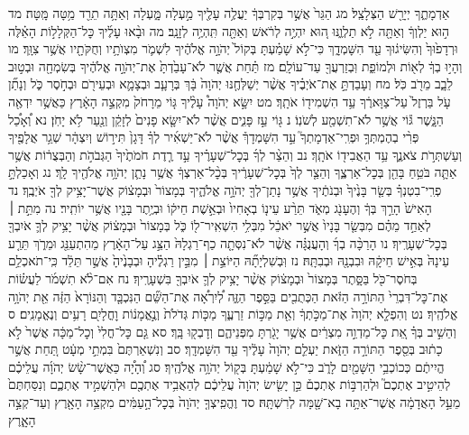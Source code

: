 \documentclass[twoside, openany, parskip=half, 11pt]{book}
\begin{document}
אַדְמָתֶ֑ךָ יְיָרֵ֖שׁ הַצְּלָצַֽל׃ מג הַגֵּר֙ אֲשֶׁ֣ר בְּקִרְבְּךָ֔ יַעֲלֶ֥ה עָלֶ֖יךָ מַ֣עְלָה מָּ֑עְלָה וְאַתָּ֥ה תֵרֵ֖ד מַ֥טָּה מָּֽטָּה׃ מד ה֣וּא יַלְוְךָ֔ וְאַתָּ֖ה לֹ֣א תַלְוֶ֑נּוּ ה֚וּא יִהְיֶ֣ה לְרֹ֔אשׁ וְאַתָּ֖ה תִּֽהְיֶ֥ה לְזָנָֽב׃ מה וּבָ֨אוּ עָלֶ֜יךָ כׇּל־הַקְּלָל֣וֹת הָאֵ֗לֶּה וּרְדָפ֙וּךָ֙ וְהִשִּׂיג֔וּךָ עַ֖ד הִשָּׁמְדָ֑ךְ כִּי־לֹ֣א שָׁמַ֗עְתָּ בְּקוֹל֙ יְהֹוָ֣ה אֱלֹהֶ֔יךָ לִשְׁמֹ֛ר מִצְוֺתָ֥יו וְחֻקֹּתָ֖יו אֲשֶׁ֥ר צִוָּֽךְ׃ מו וְהָי֣וּ בְךָ֔ לְא֖וֹת וּלְמוֹפֵ֑ת וּֽבְזַרְעֲךָ֖ עַד־עוֹלָֽם׃ מז תַּ֗חַת אֲשֶׁ֤ר לֹא־עָבַ֙דְתָּ֙ אֶת־יְהֹוָ֣ה אֱלֹהֶ֔יךָ בְּשִׂמְחָ֖ה וּבְט֣וּב לֵבָ֑ב מֵרֹ֖ב כֹּֽל׃ מח וְעָבַדְתָּ֣ אֶת־אֹיְבֶ֗יךָ אֲשֶׁ֨ר יְשַׁלְּחֶ֤נּוּ יְהֹוָה֙ בָּ֔ךְ בְּרָעָ֧ב וּבְצָמָ֛א וּבְעֵירֹ֖ם וּבְחֹ֣סֶר כֹּ֑ל וְנָתַ֞ן עֹ֤ל בַּרְזֶל֙ עַל־צַוָּארֶ֔ךָ עַ֥ד הִשְׁמִיד֖וֹ אֹתָֽךְ׃ מט יִשָּׂ֣א יְהֹוָה֩ עָלֶ֨יךָ גּ֤וֹי מֵרָחֹק֙ מִקְצֵ֣ה הָאָ֔רֶץ כַּאֲשֶׁ֥ר יִדְאֶ֖ה הַנָּ֑שֶׁר גּ֕וֹי אֲשֶׁ֥ר לֹא־תִשְׁמַ֖ע לְשֹׁנֽוֹ׃ נ גּ֖וֹי עַ֣ז פָּנִ֑ים אֲשֶׁ֨ר לֹא־יִשָּׂ֤א פָנִים֙ לְזָקֵ֔ן וְנַ֖עַר לֹ֥א יָחֹֽן׃ נא וְ֠אָכַ֠ל פְּרִ֨י בְהֶמְתְּךָ֥ וּפְרִֽי־אַדְמָתְךָ֮ עַ֣ד הִשָּׁמְדָךְ֒ אֲשֶׁ֨ר לֹא־יַשְׁאִ֜יר לְךָ֗ דָּגָן֙ תִּיר֣וֹשׁ וְיִצְהָ֔ר שְׁגַ֥ר אֲלָפֶ֖יךָ וְעַשְׁתְּרֹ֣ת צֹאנֶ֑ךָ עַ֥ד הַאֲבִיד֖וֹ אֹתָֽךְ׃ נב וְהֵצַ֨ר לְךָ֜ בְּכׇל־שְׁעָרֶ֗יךָ עַ֣ד רֶ֤דֶת חֹמֹתֶ֙יךָ֙ הַגְּבֹהֹ֣ת וְהַבְּצֻר֔וֹת אֲשֶׁ֥ר אַתָּ֛ה בֹּטֵ֥חַ בָּהֵ֖ן בְּכׇל־אַרְצֶ֑ךָ וְהֵצַ֤ר לְךָ֙ בְּכׇל־שְׁעָרֶ֔יךָ בְּכׇ֨ל־אַרְצְךָ֔ אֲשֶׁ֥ר נָתַ֛ן יְהֹוָ֥ה אֱלֹהֶ֖יךָ לָֽךְ׃ נג וְאָכַלְתָּ֣ פְרִֽי־בִטְנְךָ֗ בְּשַׂ֤ר בָּנֶ֙יךָ֙ וּבְנֹתֶ֔יךָ אֲשֶׁ֥ר נָתַן־לְךָ֖ יְהֹוָ֣ה אֱלֹהֶ֑יךָ בְּמָצוֹר֙ וּבְמָצ֔וֹק אֲשֶׁר־יָצִ֥יק לְךָ֖ אֹיְבֶֽךָ׃ נד הָאִישׁ֙ הָרַ֣ךְ בְּךָ֔ וְהֶעָנֹ֖ג מְאֹ֑ד תֵּרַ֨ע עֵינ֤וֹ בְאָחִיו֙ וּבְאֵ֣שֶׁת חֵיק֔וֹ וּבְיֶ֥תֶר בָּנָ֖יו אֲשֶׁ֥ר יוֹתִֽיר׃ נה מִתֵּ֣ת ׀ לְאַחַ֣ד מֵהֶ֗ם מִבְּשַׂ֤ר בָּנָיו֙ אֲשֶׁ֣ר יֹאכֵ֔ל מִבְּלִ֥י הִשְׁאִֽיר־ל֖וֹ כֹּ֑ל בְּמָצוֹר֙ וּבְמָצ֔וֹק אֲשֶׁ֨ר יָצִ֥יק לְךָ֛ אֹיִבְךָ֖ בְּכׇל־שְׁעָרֶֽיךָ׃ נו הָרַכָּ֨ה בְךָ֜ וְהָעֲנֻגָּ֗ה אֲשֶׁ֨ר לֹא־נִסְּתָ֤ה כַף־רַגְלָהּ֙ הַצֵּ֣ג עַל־הָאָ֔רֶץ מֵהִתְעַנֵּ֖ג וּמֵרֹ֑ךְ תֵּרַ֤ע עֵינָהּ֙ בְּאִ֣ישׁ חֵיקָ֔הּ וּבִבְנָ֖הּ וּבְבִתָּֽהּ׃ נז וּֽבְשִׁלְיָתָ֞הּ הַיּוֹצֵ֣ת ׀ מִבֵּ֣ין רַגְלֶ֗יהָ וּבְבָנֶ֙יהָ֙ אֲשֶׁ֣ר תֵּלֵ֔ד כִּֽי־תֹאכְלֵ֥ם בְּחֹסֶר־כֹּ֖ל בַּסָּ֑תֶר בְּמָצוֹר֙ וּבְמָצ֔וֹק אֲשֶׁ֨ר יָצִ֥יק לְךָ֛ אֹיִבְךָ֖ בִּשְׁעָרֶֽיךָ׃ נח אִם־לֹ֨א תִשְׁמֹ֜ר לַעֲשׂ֗וֹת אֶת־כׇּל־דִּבְרֵי֙ הַתּוֹרָ֣ה הַזֹּ֔את הַכְּתֻבִ֖ים בַּסֵּ֣פֶר הַזֶּ֑ה לְ֠יִרְאָ֠ה אֶת־הַשֵּׁ֞ם הַנִּכְבָּ֤ד וְהַנּוֹרָא֙ הַזֶּ֔ה אֵ֖ת יְהֹוָ֥ה אֱלֹהֶֽיךָ׃ נט וְהִפְלָ֤א יְהֹוָה֙ אֶת־מַכֹּ֣תְךָ֔ וְאֵ֖ת מַכּ֣וֹת זַרְעֶ֑ךָ מַכּ֤וֹת גְּדֹלֹת֙ וְנֶ֣אֱמָנ֔וֹת וׇחֳלָיִ֖ם רָעִ֥ים וְנֶאֱמָנִֽים׃ ס וְהֵשִׁ֣יב בְּךָ֗ אֵ֚ת כׇּל־מַדְוֵ֣ה מִצְרַ֔יִם אֲשֶׁ֥ר יָגֹ֖רְתָּ מִפְּנֵיהֶ֑ם וְדָבְק֖וּ בָּֽךְ׃ סא גַּ֤ם כׇּל־חֳלִי֙ וְכׇל־מַכָּ֔ה אֲשֶׁר֙ לֹ֣א כָת֔וּב בְּסֵ֖פֶר הַתּוֹרָ֣ה הַזֹּ֑את יַעְלֵ֤ם יְהֹוָה֙ עָלֶ֔יךָ עַ֖ד הִשָּׁמְדָֽךְ׃ סב וְנִשְׁאַרְתֶּם֙ בִּמְתֵ֣י מְעָ֔ט תַּ֚חַת אֲשֶׁ֣ר הֱיִיתֶ֔ם כְּכוֹכְבֵ֥י הַשָּׁמַ֖יִם לָרֹ֑ב כִּי־לֹ֣א שָׁמַ֔עְתָּ בְּק֖וֹל יְהֹוָ֥ה אֱלֹהֶֽיךָ׃ סג וְ֠הָיָ֠ה כַּאֲשֶׁר־שָׂ֨שׂ יְהֹוָ֜ה עֲלֵיכֶ֗ם לְהֵיטִ֣יב אֶתְכֶם֮ וּלְהַרְבּ֣וֹת אֶתְכֶם֒ כֵּ֣ן יָשִׂ֤ישׂ יְהֹוָה֙ עֲלֵיכֶ֔ם לְהַאֲבִ֥יד אֶתְכֶ֖ם וּלְהַשְׁמִ֣יד אֶתְכֶ֑ם וְנִסַּחְתֶּם֙ מֵעַ֣ל הָאֲדָמָ֔ה אֲשֶׁר־אַתָּ֥ה בָא־שָׁ֖מָּה לְרִשְׁתָּֽהּ׃ סד וֶהֱפִֽיצְךָ֤ יְהֹוָה֙ בְּכׇל־הָ֣עַמִּ֔ים מִקְצֵ֥ה הָאָ֖רֶץ וְעַד־קְצֵ֣ה הָאָ֑רֶץ 
\end{document}
